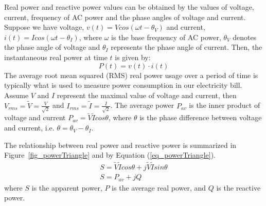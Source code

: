 Real power and reactive power values can be
obtained by the values of voltage, current, frequency of AC power and the phase angles of voltage and current. 
Suppose we have voltage, $v(t)= V cos(\omega t - \theta_V)$ and current, $i(t)= I cos(\omega t - \theta_I)$,
where $\omega$ is the base frequency of AC power,
$\theta_V$ denotes the phase angle of voltage and
$\theta_I$ represents the phase angle of current.
Then, the instantaneous real power at time $t$ is given by:
\begin{equation}
\label{eq_insPower}
P(t)= v(t) \cdot i(t)
\end{equation}
The average root mean squared (RMS) real power usage over a period of time is typically what is
used to measure power consumption in our electricity bill.
Assume $V$ and $I$ represent the maximal value of voltage and current, then
$V_{rms} = \tilde{V} = \frac{V}{\sqrt{2}}$ and $I_{rms} = \tilde{I} = \frac{I}{\sqrt{2}}$.
The average power $P_{av}$ is the inner product of voltage and current $P_{av}=\tilde{V}\tilde{I}cos\theta$, 
where $\theta$ is the phase difference between voltage and current,
i.e. $\theta= \theta_V - \theta_I$.



The relationship between real power and reactive power is summarized in
Figure~\ref{fig_powerTriangle} and by
Equation (\ref{eq_powerTriangle}).
\begin{subequations}
\begin{align}
S=\tilde{V}\tilde{I}cos\theta+ j\tilde{V}\tilde{I}sin\theta \\
S=P_{av}+j Q \label{eq_powerTriangle}
\end{align}
\end{subequations}
\noindent
where $S$ is the apparent power,
$P$ is the average real power,
and $Q$ is the reactive power.

